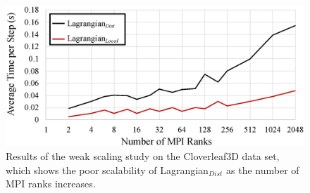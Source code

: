 \begin{figure}[!t]
\centering
\includegraphics[width=0.9\linewidth]{Images/total_time.eps}
\caption{{Results of the weak scaling study on the Cloverleaf3D data set, which shows the poor scalability of Lagrangian$_{Dist}$ as the number of MPI ranks increases.}}
\vspace{-5mm}
\label{fig:total_time}
\end{figure}
